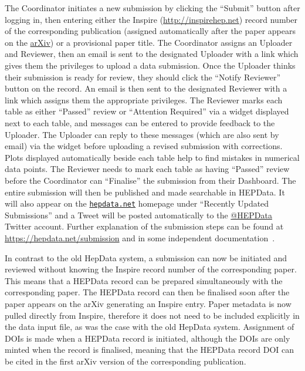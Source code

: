 \documentclass[a4paper]{jpconf}
\begin{document}
The Coordinator initiates a new submission by clicking the ``Submit'' button
after logging in, then entering either the Inspire
(\url{http://inspirehep.net}) record number of the corresponding publication
(assigned automatically after the paper appears on the
\href{https://arxiv.org/}{arXiv}) or a provisional paper title.  The
Coordinator assigns an Uploader and Reviewer, then an email is sent to the
designated Uploader with a link which gives them the privileges to upload a
data submission.  Once the Uploader thinks their submission is ready for
review, they should click the ``Notify Reviewer'' button on the record.  An
email is then sent to the designated Reviewer with a link which assigns them
the appropriate privileges.  The Reviewer marks each table as either
``Passed'' review or ``Attention Required'' via a widget displayed next to each
table, and messages can be entered to provide feedback to the Uploader.  The
Uploader can reply to these messages (which are also sent by email) via the
widget before uploading a revised submission with corrections.  Plots displayed
automatically beside each table help to find mistakes in numerical data points.
 The Reviewer needs to mark each table as having ``Passed'' review before the
Coordinator can ``Finalise'' the submission from their Dashboard.  The entire
submission will then be published and made searchable in HEPData.  It will also
appear on the \href{https://www.hepdata.net}{\texttt{hepdata.net}} homepage
under ``Recently Updated Submissions'' and a Tweet will be posted automatically
to the \href{https://twitter.com/HEPData}{@HEPData} Twitter account.  Further
explanation of the submission steps can be found at
\url{https://hepdata.net/submission} and in some independent
documentation~\cite{matteo_bonanomi_2016_197109}.

In contrast to the old HepData system, a submission can now be initiated and
reviewed without knowing the Inspire record number of the corresponding paper.
 This means that a HEPData record can be prepared simultaneously with the
corresponding paper.  The HEPData record can then be finalised soon after the
paper appears on the arXiv generating an Inspire entry.  Paper metadata is now
pulled directly from Inspire, therefore it does not need to be included
explicitly in the data input file, as was the case with the old HepData system.
 Assignment of DOIs is made when a HEPData record is initiated, although the 
DOIs are only minted when the record is finalised, meaning that the HEPData
record DOI can be cited in the first arXiv version of the corresponding
publication.
\end{document}

